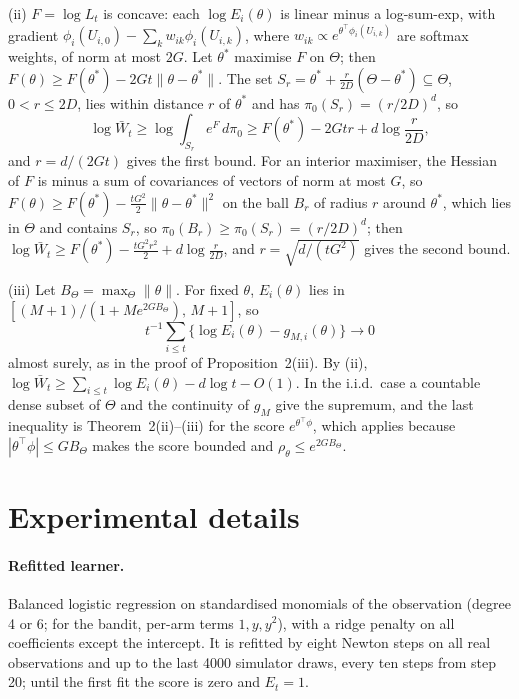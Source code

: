 \documentclass[11pt]{article}
\theoremstyle{remark}
\begin{document}
(ii) $F = \log L_t$ is concave: each $\log E_i(\theta)$ is linear minus a
log-sum-exp, with gradient $\phi_i(U_{i,0}) - \sum_k w_{ik}\phi_i(U_{i,k})$, where
$w_{ik} \propto e^{\theta^\top\phi_i(U_{i,k})}$ are softmax weights, of norm at
most $2G$. Let $\theta^*$ maximise $F$ on $\Theta$; then
$F(\theta) \ge F(\theta^*) - 2Gt\|\theta - \theta^*\|$. The set
$S_r = \theta^* + \frac{r}{2D}(\Theta - \theta^*) \subseteq \Theta$, $0 < r \le 2D$,
lies within distance $r$ of $\theta^*$ and has $\pi_0(S_r) = (r/2D)^d$, so
\[
\log \bar W_t \ge \log\int_{S_r} e^{F}\, d\pi_0 \ge F(\theta^*) - 2Gtr + d \log\frac{r}{2D},
\]
and $r = d/(2Gt)$ gives the first bound. For an interior maximiser, the
Hessian of $F$ is minus a sum of covariances of vectors of norm at most $G$, so
$F(\theta) \ge F(\theta^*) - \frac{tG^2}{2}\|\theta-\theta^*\|^2$ on the ball $B_r$
of radius $r$ around $\theta^*$, which lies in $\Theta$ and contains $S_r$, so
$\pi_0(B_r) \ge \pi_0(S_r) = (r/2D)^d$; then
$\log \bar W_t \ge F(\theta^*) - \frac{tG^2 r^2}{2} + d\log\frac{r}{2D}$, and
$r = \sqrt{d/(tG^2)}$ gives the second bound.

(iii) Let $B_\Theta = \max_\Theta\|\theta\|$. For fixed $\theta$, $E_i(\theta)$
lies in $[(M+1)/(1 + M e^{2GB_\Theta}),\, M+1]$, so
\[
t^{-1}\textstyle\sum_{i\le t}\{\log E_i(\theta) - g_{M,i}(\theta)\} \to 0
\]
almost surely, as in the proof of
Proposition~2(iii). By (ii),
$\log \bar W_t \ge \sum_{i \le t} \log E_i(\theta) - d\log t - O(1)$. In the
i.i.d.\ case a countable dense subset of $\Theta$ and the continuity of $g_M$
give the supremum, and the last inequality is Theorem~2(ii)--(iii)
for the score $e^{\theta^\top\phi}$, which applies because
$|\theta^\top\phi| \le GB_\Theta$ makes the score bounded and
$\rho_\theta \le e^{2GB_\Theta}$.

\section{Experimental details}\label{app:details}

\paragraph{Refitted learner.} Balanced logistic regression on standardised
monomials of the observation (degree 4 or 6; for the bandit, per-arm terms
$1, y, y^2$), with a ridge penalty on all coefficients except the intercept.
It is refitted by eight Newton steps on all real observations and up to the
last 4000 simulator draws, every ten steps from step 20; until the first fit
the score is zero and $E_t = 1$.
\end{document}
